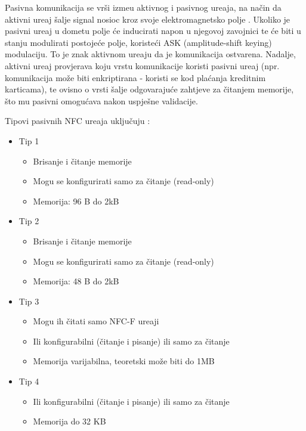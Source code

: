 Pasivna komunikacija se vr\v{s}i izme\dj u aktivnog i pasivnog ure\dj aja, na na\v{c}in da aktivni ure\dj aj \v{s}alje signal nosioc kroz svoje elektromagnetsko polje \cite{nfc_arhitektura}. Ukoliko je pasivni ure\dj aj u dometu polje \'{c}e inducirati napon u njegovoj zavojnici te \'{c}e biti u stanju modulirati postoje\'{c}e polje, koriste\'{c}i ASK (amplitude-shift keying) modulaciju. To je znak aktivnom ure\dj aju da je komunikacija ostvarena. Nadalje, aktivni ure\dj aj provjerava koju vrstu komunikacije koristi pasivni ure\dj aj (npr. komunikacija mo\v{z}e biti enkriptirana - koristi se kod pla\'{c}anja kreditnim karticama), te ovisno o vrsti \v{s}alje odgovaraju\'{c}e zahtjeve za \v{c}itanjem memorije, \v{s}to mu pasivni omogu\'{c}ava nakon uspje\v{s}ne validacije.



Tipovi pasivnih NFC ure\dj aja uklju\v{c}uju \cite{nfc_pasivni}:

\begin{itemize}
	\item Tip 1
	\begin{itemize}
		\item Brisanje i \v{c}itanje memorije
		\item Mogu se konfigurirati samo za \v{c}itanje (read-only)
		\item Memorija: 96 B do 2kB
	\end{itemize}

	\item Tip 2
	\begin{itemize}
		\item Brisanje i \v{c}itanje memorije
		\item Mogu se konfigurirati samo za \v{c}itanje (read-only)
		\item Memorija: 48 B do 2kB
	\end{itemize}

	\item Tip 3
	\begin{itemize}
		\item Mogu ih \v{c}itati samo NFC-F ure\dj aji
		\item Ili konfigurabilni (\v{c}itanje i pisanje) ili samo za \v{c}itanje
		\item  Memorija varijabilna, teoretski mo\v{z}e biti do 1MB
	\end{itemize}

	\item Tip 4
	\begin{itemize}
		\item Ili konfigurabilni (\v{c}itanje i pisanje) ili samo za \v{c}itanje
		\item Memorija do 32 KB
	\end{itemize}
\end{itemize}


